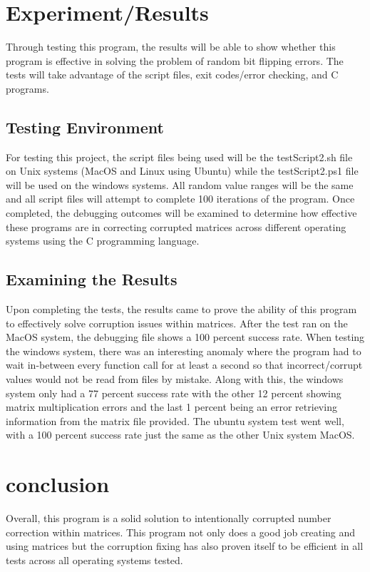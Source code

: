 \documentclass{article}
\begin{document}
    \vskip 13mm
    \begin{multicols}{2}
    \section{Experiment/Results}\label{sec:ex/res}
    Through testing this program, the results will be able to show whether this program is effective in solving the problem
    of random bit flipping errors. The tests will take advantage of the script files, exit codes/error checking, and C programs.
    \subsection{Testing Environment}\label{subsec:environment}
    For testing this project, the script files being used will be the testScript2.sh file on Unix systems (MacOS and Linux using Ubuntu)
    while the testScript2.ps1 file will be used on the windows systems. All random value ranges will be the same and all script files will
    attempt to complete 100 iterations of the program. Once completed, the debugging outcomes will be examined to determine how effective
    these programs are in correcting corrupted matrices across different operating systems using the C programming language.
    \subsection{Examining the Results}\label{subsec:examineres}
    Upon completing the tests, the results came to prove the ability of this program to effectively solve corruption issues within matrices.
    After the test ran on the MacOS system, the debugging file shows a 100 percent success rate. When testing the windows system, there was
    an interesting anomaly where the program had to wait in-between every function call for at least a second so that incorrect/corrupt values 
    would not be read from files by mistake. Along with this, the windows system only had a 77 percent success rate with the other 12 percent showing matrix multiplication errors and
    the last 1 percent being an error retrieving information from the matrix file provided. The ubuntu system test went well, with a 100 percent success rate just the same as the other Unix
    system MacOS.

    \section{conclusion}\label{sec:conclusion}
    Overall, this program is a solid solution to intentionally corrupted number correction within matrices. This program not only does a good job
    creating and using matrices but the corruption fixing has also proven itself to be efficient in all tests across all operating systems tested. 

    \end{multicols}

    \nocite{galbraith}
    \nocite{scoles}
    \nocite{normand}
    \nocite{michalak}

    \newpage
    
    \label{refs}
\end{document}
